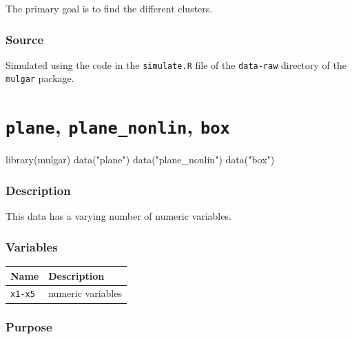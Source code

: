 \documentclass[
  letterpaper,
]{krantz}
\newenvironment{Shaded}{\begin{snugshade}}{\end{snugshade}}
\newcommand{\FunctionTok}[1]{\textcolor[rgb]{0.28,0.35,0.67}{#1}}
\newcommand{\NormalTok}[1]{\textcolor[rgb]{0.00,0.23,0.31}{#1}}
\newcommand{\StringTok}[1]{\textcolor[rgb]{0.13,0.47,0.30}{#1}}
\newcounter{none} %
\begin{document}
The primary goal is to find the different clusters.

\subsubsection*{Source}\label{source-8}

Simulated using the code in the \texttt{simulate.R} file of the
\texttt{data-raw} directory of the \texttt{mulgar} package.

\section{\texorpdfstring{\texttt{plane}, \texttt{plane\_nonlin},
\texttt{box}}{plane, plane\_nonlin, box}}\label{plane-plane_nonlin-box}

\begin{Shaded}
\begin{Highlighting}[]
\FunctionTok{library}\NormalTok{(mulgar)}
\FunctionTok{data}\NormalTok{(}\StringTok{"plane"}\NormalTok{)}
\FunctionTok{data}\NormalTok{(}\StringTok{"plane\_nonlin"}\NormalTok{)}
\FunctionTok{data}\NormalTok{(}\StringTok{"box"}\NormalTok{)}
\end{Highlighting}
\end{Shaded}

\subsubsection*{Description}\label{description-9}

This data has a varying number of numeric variables.

\subsubsection*{Variables}\label{variables-9}

{\def\LTcaptype{none} %
\begin{longtable}[]{@{}ll@{}}
\toprule\noalign{}
Name & Description \\
\midrule\noalign{}
\endhead
\bottomrule\noalign{}
\endlastfoot
\texttt{x1-x5} & numeric variables \\
\end{longtable}
}

\subsubsection*{Purpose}\label{purpose-9}
\end{document}
